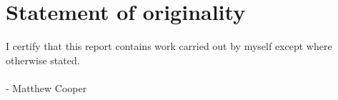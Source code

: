 \chapter{Statement of originality}
\label{ch:originality}

I certify that this report contains work carried out by myself except where otherwise
stated.
\\
\\
 - Matthew Cooper
\\
\\

